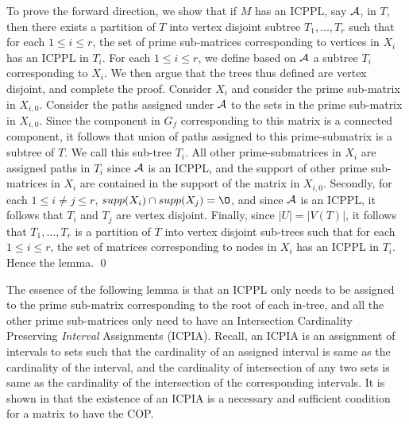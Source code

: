 \documentclass{fsttcs}
\def\cA{{\cal A}}
\begin{document}
\noindent
To prove the forward direction, we show that if $M$ has an ICPPL, say
$\cA$, in $T$, then there exists 
  a partition of $T$ into vertex disjoint subtree $T_1, \ldots, T_r$
  such that for each $1 \leq i \leq r$, the set of prime sub-matrices
  corresponding to vertices in $X_i$ has an ICPPL in $T_i$.  For each
  $1 \leq i \leq r$, we define based on $\cA$ a subtree  
$T_i$ corresponding to $X_i$.  We then argue that the trees thus
defined are vertex disjoint, and complete the proof. 
 Consider $X_i$ and consider the prime sub-matrix in $X_{i,0}$.
 Consider the paths assigned under $\cA$ to the sets in the prime
 sub-matrix in $X_{i,0}$.  Since the component in $G_f$ corresponding
 to this matrix is a connected component, it follows that union of
 paths assigned to this prime-submatrix is a subtree of $T$.  We call
 this sub-tree $T_i$.  All other prime-submatrices in $X_i$ are
 assigned paths in $T_i$ since $\cA$ is an ICPPL, and the support of
 other prime sub-matrices in $X_i$ are contained in the support of the
 matrix in $X_{i,0}$.  Secondly, for each $1 \leq i \neq j \leq r$,
 $supp(X_i) \cap supp(X_j) = \O$, and since $\cA$ is an ICPPL, it
 follows that $T_i$ and $T_j$ are vertex disjoint.  Finally, since
 $|U| = |V(T)|$, it follows that $T_1, \ldots, T_r$ is a partition of
 $T$ into vertex disjoint sub-trees such that for each $1 \leq i \leq
 r$, the set of matrices corresponding to nodes in $X_i$ has an ICPPL
 in $T_i$.  Hence the lemma. 
\qed

\noindent
 The essence of the following lemma is that an ICPPL only needs to be
 assigned to the prime sub-matrix corresponding to the root of each
 in-tree, and all the other prime sub-matrices only need to have an
 Intersection Cardinality Preserving {\em Interval} Assignments (ICPIA).
 Recall, an ICPIA is an assignment of intervals to sets such that the
 cardinality of an assigned interval is same as the cardinality of the
 interval, and the cardinality of intersection of any two sets is same
 as the cardinality of the intersection of the corresponding
 intervals.  It is shown in \cite{nsnrs09} that the existence of an
 ICPIA is a necessary and sufficient condition for a matrix to have
 the COP. 
\end{document}
